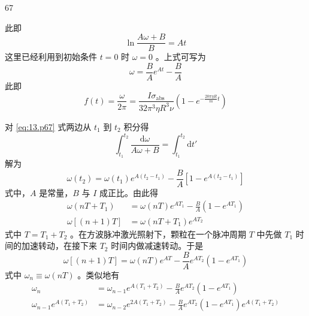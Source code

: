 \begin{solution}{67}
\begin{subsolution}
        此即
        \begin{equation*}
            \ln\frac{A\omega + B}{B} = At
        \end{equation*}
        这里已经利用到初始条件 $t=0$ 时 $\omega=0$ 。上式可写为
        \begin{equation*}
            \omega = \frac{B}{A}e^{At} - \frac{B}{A}
        \end{equation*}
        此即
        \begin{equation}
            f(t) = \frac{\omega}{2\pi} = \frac{I\sigma_{\mathrm{abs}}}{32\pi^{3}\eta R^{3}\nu} \left(1 - e^{-\frac{20\pi\eta R}{m}t}\right) \label{eq:15.p67}
        \end{equation}
    \end{subsolution}
    \begin{subsolution}
        对 \eqref{eq:13.p67} 式两边从 $t_{1}$ 到 $t_{2}$ 积分得
        \begin{equation*}
            \int_{t_{1}}^{t_{2}} \frac{\mathrm{d}\omega}{A\omega + B} = \int_{t_{1}}^{t_{2}} \mathrm{d}t'
        \end{equation*}
        解为
        \begin{equation*}
            \omega(t_{2}) = \omega(t_{1}) e^{A(t_{2}-t_{1})} - \frac{B}{A} \left[1 - e^{A(t_{2}-t_{1})}\right]
        \end{equation*}
        式中，$A$ 是常量，$B$ 与 $I$ 成正比。由此得
        \begin{align}
            \omega(nT + T_{1}) &= \omega(nT) e^{A T_{1}} - \frac{B}{A}(1 - e^{A T_{1}}) \label{eq:16.p67} \\
            \omega[(n+1)T] &= \omega(nT + T_{1}) e^{A T_{2}} \label{eq:17.p67}
        \end{align}
        式中 $T = T_{1} + T_{2}$ 。在方波脉冲激光照射下，颗粒在一个脉冲周期 $T$ 中先做 $T_{1}$ 时间的加速转动，在接下来 $T_{2}$ 时间内做减速转动。于是
        \begin{equation}
            \omega[(n+1)T] = \omega(nT) e^{A T} - \frac{B}{A} e^{A T_{2}}(1 - e^{A T_{1}}) \label{eq:18.p67}
        \end{equation}
        式中 $\omega_{n}\equiv\omega(nT)$ 。类似地有
        \begin{align*}
            \omega_{n} &= \omega_{n-1} e^{A(T_{1}+T_{2})} - \frac{B}{A} e^{A T_{2}}(1 - e^{A T_{1}}) \\
            \omega_{n-1} e^{A(T_{1}+T_{2})} &= \omega_{n-2} e^{2A(T_{1}+T_{2})} - \frac{B}{A} e^{A T_{2}}(1 - e^{A T_{1}}) e^{A(T_{1}+T_{2})} \\

\end{align*}
\end{subsolution}
\end{solution}
